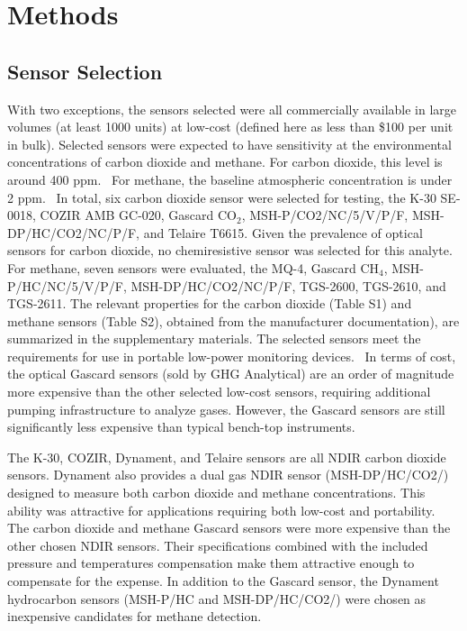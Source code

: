 \documentclass[times]{joehreview}
\begin{document}
	\section*{Methods}
	\label{sec:methods}
	
	\subsection*{Sensor Selection}
	
	With two exceptions, the sensors selected were all commercially available in large volumes (at least 1000 units) at low-cost (defined here as less than \$100 per unit in bulk). Selected sensors were expected to have sensitivity at the environmental concentrations of carbon dioxide and methane. For carbon dioxide, this level is around 400 ppm.~\cite{blasing_recent_2016,dlugokencky_trends_2016}  For methane, the baseline atmospheric concentration is under 2 ppm.~\cite{turner_large_2016,bamberger_spatial_2014,dlugokencky_trends_2016-1}  In total, six carbon dioxide sensor were selected for testing, the K-30 SE-0018, COZIR AMB GC-020, Gascard CO$_{2}$, MSH-P/CO2/NC/5/V/P/F, MSH-DP/HC/CO2/NC/P/F, and Telaire T6615.  Given the prevalence of optical sensors for carbon dioxide, no chemiresistive sensor was selected for this analyte.  For methane, seven sensors were evaluated, the MQ-4, Gascard CH$_{4}$, MSH-P/HC/NC/5/V/P/F, MSH-DP/HC/CO2/NC/P/F, TGS-2600, TGS-2610, and TGS-2611.  The relevant properties for the carbon dioxide (Table S1) and methane sensors (Table S2), obtained from the manufacturer documentation), are summarized in the supplementary materials.  The selected sensors meet the requirements for use in portable low-power monitoring devices.~\cite{karpov_energy_2013}  In terms of cost, the optical Gascard sensors (sold by GHG Analytical) are an order of magnitude more expensive than the other selected low-cost sensors, requiring additional pumping infrastructure to analyze gases.  However, the Gascard sensors are still significantly less expensive than typical bench-top instruments.
	
	The K-30, COZIR, Dynament, and Telaire sensors are all NDIR carbon dioxide sensors.  Dynament also provides a dual gas NDIR sensor (MSH-DP/HC/CO2/) designed to measure both carbon dioxide and methane concentrations. This ability was attractive for applications requiring both low-cost and portability.  The carbon dioxide and methane Gascard sensors were more expensive than the other chosen NDIR sensors.  Their specifications combined with the included pressure and temperatures compensation make them attractive enough to compensate for the expense. In addition to the Gascard sensor, the Dynament hydrocarbon sensors (MSH-P/HC and MSH-DP/HC/CO2/) were chosen as inexpensive candidates for methane detection.
	
\end{document}
